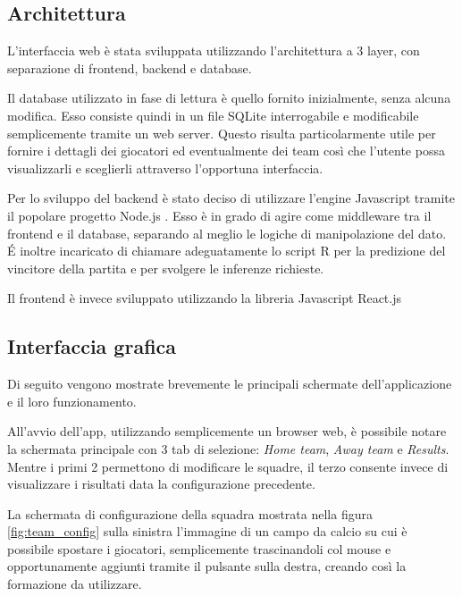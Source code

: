 \documentclass[hidelinks, 12pt]{article}
\begin{document}
\subsection{Architettura}

L'interfaccia web è stata sviluppata utilizzando l'architettura a 3 layer, con separazione di frontend, backend e database.

Il database utilizzato in fase di lettura è quello fornito inizialmente, senza alcuna modifica. Esso consiste quindi in un file SQLite interrogabile e modificabile semplicemente tramite un web server. Questo risulta particolarmente utile per fornire i dettagli dei giocatori ed eventualmente dei team così che l'utente possa visualizzarli e sceglierli attraverso l'opportuna interfaccia.

Per lo sviluppo del backend è stato deciso di utilizzare l'engine Javascript tramite il popolare progetto Node.js \cite{site:nodejs}. Esso è in grado di agire come middleware tra il frontend e il database, separando al meglio le logiche di manipolazione del dato. \'E inoltre incaricato di chiamare adeguatamente lo script R per la predizione del vincitore della partita e per svolgere le inferenze richieste.

Il frontend è invece sviluppato utilizzando la libreria Javascript React.js \cite{site:react}



\subsection{Interfaccia grafica}

Di seguito vengono mostrate brevemente le principali schermate dell'applicazione e il loro funzionamento.

All'avvio dell'app, utilizzando semplicemente un browser web, è possibile notare la schermata principale con 3 tab di selezione: {\it Home team}, {\it Away team} e {\it Results}. Mentre i primi 2 permettono di modificare le squadre, il terzo consente invece di visualizzare i risultati data la configurazione precedente.

La schermata di configurazione della squadra mostrata nella figura \ref{fig:team_config} sulla sinistra l'immagine di un campo da calcio su cui è possibile spostare i giocatori, semplicemente trascinandoli col mouse e opportunamente aggiunti tramite il pulsante sulla destra, creando così la formazione da utilizzare. 
\end{document}
